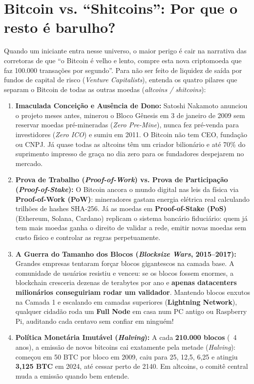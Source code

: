 \documentclass{pousadaguide}
\begin{document}
\section{Bitcoin vs. “Shitcoins”: Por que o resto é barulho?}

Quando um iniciante entra nesse universo, o maior perigo é cair na narrativa das corretoras de que ``o Bitcoin é velho e lento, compre esta nova criptomoeda que faz 100.000 transações por segundo''. Para não ser feito de liquidez de saída por fundos de capital de risco (\emph{Venture Capitalists}), entenda os quatro pilares que separam o Bitcoin de todas as outras moedas (\emph{altcoins / shitcoins}):

\begin{enumerate}
  \item \textbf{Imaculada Conceição e Ausência de Dono:} Satoshi Nakamoto anunciou o projeto meses antes, minerou o Bloco Gênesis em 3 de janeiro de 2009 sem reservar moedas pré-mineradas (\emph{Zero Pre-Mine}), nunca fez pré-venda para investidores (\emph{Zero ICO}) e sumiu em 2011. O Bitcoin não tem CEO, fundação ou CNPJ. Já quase todas as altcoins têm um criador bilionário e até 70\% do suprimento impresso de graça no dia zero para os fundadores despejarem no mercado.
  \item \textbf{Prova de Trabalho (\emph{Proof-of-Work}) vs. Prova de Participação (\emph{Proof-of-Stake}):} O Bitcoin ancora o mundo digital nas leis da física via \textbf{Proof-of-Work (PoW)}: mineradores gastam energia elétrica real calculando trilhões de hashes SHA-256. Já as moedas em \textbf{Proof-of-Stake (PoS)} (Ethereum, Solana, Cardano) replicam o sistema bancário fiduciário: quem já tem mais moedas ganha o direito de validar a rede, emitir novas moedas sem custo físico e controlar as regras perpetuamente.
  \item \textbf{A Guerra do Tamanho dos Blocos (\emph{Blocksize Wars}, 2015--2017):} Grandes empresas tentaram forçar blocos gigantescos na camada base. A comunidade de usuários resistiu e venceu: se os blocos fossem enormes, a blockchain cresceria dezenas de terabytes por ano e \textbf{apenas datacenters milionários conseguiriam rodar um validador}. Mantendo blocos enxutos na Camada 1 e escalando em camadas superiores (\textbf{Lightning Network}), qualquer cidadão roda um \textbf{Full Node} em casa num PC antigo ou Raspberry Pi, auditando cada centavo sem confiar em ninguém!
  \item \textbf{Política Monetária Imutável (\emph{Halving}):} A cada \textbf{210.000 blocos} (~4 anos), a emissão de novos bitcoins cai exatamente pela metade (\emph{Halving}): começou em 50 BTC por bloco em 2009, caiu para 25, 12,5, 6,25 e atingiu \textbf{3,125 BTC} em 2024, até cessar perto de 2140. Em altcoins, o comitê central muda a emissão quando bem entende.
\end{enumerate}
\end{document}
